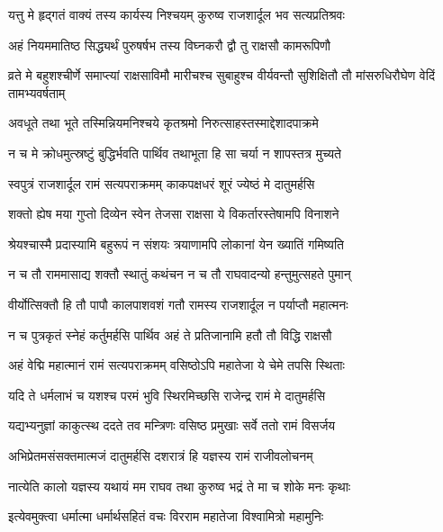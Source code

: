 \twolineshloka
{यत्तु मे हृद्गतं वाक्यं तस्य कार्यस्य निश्चयम्}
{कुरुष्व राजशार्दूल भव सत्यप्रतिश्रवः} %

\twolineshloka
{अहं नियममातिष्ठ सिद्ध्यर्थं पुरुषर्षभ}
{तस्य विघ्नकरौ द्वौ तु राक्षसौ कामरूपिणौ} %

\threelineshloka
{व्रते मे बहुशश्चीर्णे समाप्त्यां राक्षसाविमौ}
{मारीचश्च सुबाहुश्च वीर्यवन्तौ सुशिक्षितौ}
{तौ मांसरुधिरौघेण वेदिं तामभ्यवर्षताम्} %

\twolineshloka
{अवधूते तथा भूते तस्मिन्नियमनिश्चये}
{कृतश्रमो निरुत्साहस्तस्माद्देशादपाक्रमे} %

\twolineshloka
{न च मे क्रोधमुत्स्रष्टुं बुद्धिर्भवति पार्थिव}
{तथाभूता हि सा चर्या न शापस्तत्र मुच्यते} %

\twolineshloka
{स्वपुत्रं राजशार्दूल रामं सत्यपराक्रमम्}
{काकपक्षधरं शूरं ज्येष्ठं मे दातुमर्हसि} %

\twolineshloka
{शक्तो ह्येष मया गुप्तो दिव्येन स्वेन तेजसा}
{राक्षसा ये विकर्तारस्तेषामपि विनाशने} %

\twolineshloka
{श्रेयश्चास्मै प्रदास्यामि बहुरूपं न संशयः}
{त्रयाणामपि लोकानां येन ख्यातिं गमिष्यति} %

\twolineshloka
{न च तौ राममासाद्य शक्तौ स्थातुं कथंचन}
{न च तौ राघवादन्यो हन्तुमुत्सहते पुमान्} %

\twolineshloka
{वीर्योत्सिक्तौ हि तौ पापौ कालपाशवशं गतौ}
{रामस्य राजशार्दूल न पर्याप्तौ महात्मनः} %

\twolineshloka
{न च पुत्रकृतं स्नेहं कर्तुमर्हसि पार्थिव}
{अहं ते प्रतिजानामि हतौ तौ विद्धि राक्षसौ} %

\twolineshloka
{अहं वेद्मि महात्मानं रामं सत्यपराक्रमम्}
{वसिष्ठोऽपि महातेजा ये चेमे तपसि स्थिताः} %

\twolineshloka
{यदि ते धर्मलाभं च यशश्च परमं भुवि}
{स्थिरमिच्छसि राजेन्द्र रामं मे दातुमर्हसि} %

\twolineshloka
{यद्यभ्यनुज्ञां काकुत्स्थ ददते तव मन्त्रिणः}
{वसिष्ठ प्रमुखाः सर्वे ततो रामं विसर्जय} %

\twolineshloka
{अभिप्रेतमसंसक्तमात्मजं दातुमर्हसि}
{दशरात्रं हि यज्ञस्य रामं राजीवलोचनम्} %

\twolineshloka
{नात्येति कालो यज्ञस्य यथायं मम राघव}
{तथा कुरुष्व भद्रं ते मा च शोके मनः कृथाः} %

\twolineshloka
{इत्येवमुक्त्वा धर्मात्मा धर्मार्थसहितं वचः}
{विरराम महातेजा विश्वामित्रो महामुनिः} %

